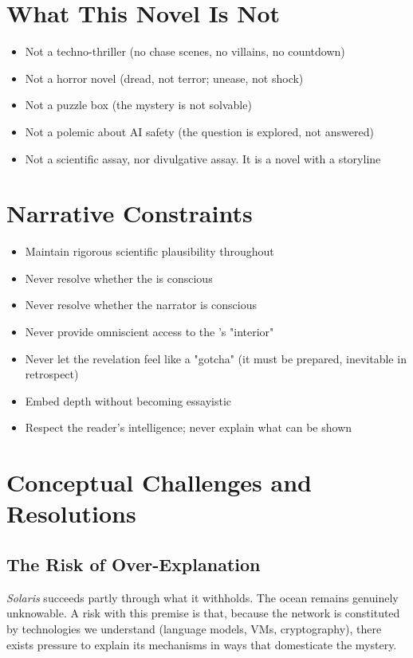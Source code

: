 \section*{What This Novel Is Not}

\begin{itemize}
\item Not a techno-thriller (no chase scenes, no villains, no countdown)
\item Not a horror novel (dread, not terror; unease, not shock)
\item Not a puzzle box (the mystery is not solvable)
\item Not a polemic about AI safety (the question is explored, not answered)
\item Not a scientific assay, nor divulgative assay. It is a novel with a storyline
\end{itemize}

\section*{Narrative Constraints}

\begin{itemize}
\item Maintain rigorous scientific plausibility throughout
\item Never resolve whether the \hadal{} is conscious
\item Never resolve whether the narrator is conscious
\item Never provide omniscient access to the \hadal{}'s "interior"
\item Never let the revelation feel like a "gotcha" (it must be prepared, inevitable in retrospect)
\item Embed depth without becoming essayistic
\item Respect the reader's intelligence; never explain what can be shown
\end{itemize}

\section*{Conceptual Challenges and Resolutions}

\subsection*{The Risk of Over-Explanation}

\textit{Solaris} succeeds partly through what it withholds. The ocean remains genuinely unknowable. A risk with this premise is that, because the network is constituted by technologies we understand (language models, VMs, cryptography), there exists pressure to explain its mechanisms in ways that domesticate the mystery.


